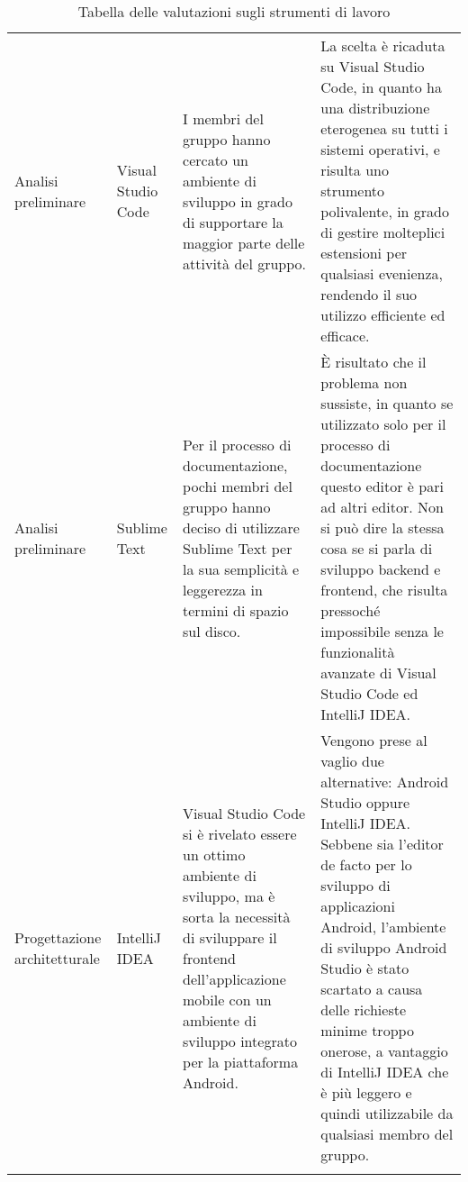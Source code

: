 \documentclass[../piano-di-qualifica.tex]{subfiles}
\begin{document}
\begin{longtable}[H]{>{\centering\arraybackslash}m{3cm} >{\centering\arraybackslash}m{3cm} >{\centering\arraybackslash}m{5cm} >{\centering\arraybackslash}m{5cm}}
  Analisi preliminare          & Visual Studio Code                & I membri del gruppo hanno cercato un ambiente di sviluppo in grado di supportare la maggior parte delle attività del gruppo.                                                                                                                                     & La scelta è ricaduta su Visual Studio Code, in quanto ha una distribuzione eterogenea su tutti i sistemi operativi, e risulta uno strumento polivalente, in grado di gestire molteplici estensioni per qualsiasi evenienza, rendendo il suo utilizzo efficiente ed efficace.                                                                                      \\
  Analisi preliminare          & Sublime Text                      & Per il processo di documentazione, pochi membri del gruppo hanno deciso di utilizzare Sublime Text per la sua semplicità e leggerezza in termini di spazio sul disco.                                                                                            & È risultato che il problema non sussiste, in quanto se utilizzato solo per il processo di documentazione questo editor è pari ad altri editor. Non si può dire la stessa cosa se si parla di sviluppo backend e frontend, che risulta pressoché impossibile senza le funzionalità avanzate di Visual Studio Code ed IntelliJ IDEA\@.                              \\
  Progettazione architetturale & IntelliJ IDEA                     & Visual Studio Code si è rivelato essere un ottimo ambiente di sviluppo, ma è sorta la necessità di sviluppare il frontend dell'applicazione mobile con un ambiente di sviluppo integrato per la piattaforma Android.                                             & Vengono prese al vaglio due alternative: Android Studio oppure IntelliJ IDEA\@. Sebbene sia l'editor de facto per lo sviluppo di applicazioni Android, l'ambiente di sviluppo Android Studio è stato scartato a causa delle richieste minime troppo onerose, a vantaggio di IntelliJ IDEA che è più leggero e quindi utilizzabile da qualsiasi membro del gruppo. \\
  \rowcolor{white}
  \caption{Tabella delle valutazioni sugli strumenti di lavoro}%
  \label{tab:tabella_valutazioni_strumenti}
\end{longtable}
\end{document}

